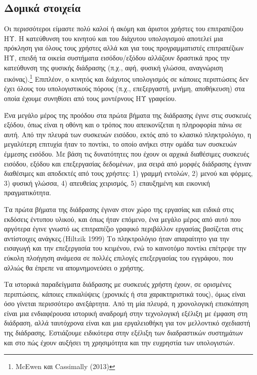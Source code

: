 \documentclass[
]{article}
\begin{document}
\hypertarget{ux3b4ux3bfux3bcux3b9ux3baux3ac-ux3c3ux3c4ux3bfux3b9ux3c7ux3b5ux3afux3b1}{%
\subsection{Δομικά
στοιχεία}\label{ux3b4ux3bfux3bcux3b9ux3baux3ac-ux3c3ux3c4ux3bfux3b9ux3c7ux3b5ux3afux3b1}}

Οι περισσότεροι είμαστε πολύ καλοί ή ακόμη και άριστοι χρήστες του
επιτραπέζιου ΗΥ. Η κατεύθυνση του κινητού και του διάχυτου υπολογισμού
αποτελεί μια πρόκληση για όλους τους χρήστες αλλά και για τους
προγραμματιστές επιτραπέζιων ΗΥ, επειδή τα οικεία συστήματα
εισόδου/εξόδου αλλάζουν δραστικά προς την κατεύθυνση της φυσικής
διάδρασης (π.χ., αφή, φυσική γλώσσα, αναγνώριση εικόνας).\footnote{McEwen
  και Cassimally (2013)} Επιπλέον, ο κινητός και διάχυτος υπολογισμός σε
κάποιες περιπτώσεις δεν έχει όλους του υπολογιστικούς πόρους (π.χ.,
επεξεργαστή, μνήμη, αποθήκευση) στα οποία έχουμε συνηθίσει από τους
μοντέρνους ΗΥ γραφείου.

Ένα μεγάλο μέρος της προόδου στα πρώτα βήματα της διάδρασης έγινε στις
συσκευές εξόδου, όπως είναι η οθόνη και ο τρόπος που απεικονίζεται η
πληροφορία πάνω σε αυτή. Από την πλευρά των συσκευών εισόδου, εκτός από
το κλασικό πληκτρολόγιο, η μεγαλύτερη επιτυχία ήταν το ποντίκι, το οποίο
ανήκει στην ομάδα των συσκευών έμμεσης εισόδου. Με βάση τις δυνατότητες
που έχουν οι αρχικά διαθέσιμες συσκευές εισόδου, εξόδου και επεξεργασίας
δεδομένων, μια σειρά από μορφές διάδρασης έγιναν διαθέσιμες και
αποδεκτές από τους χρήστες: 1) γραμμή εντολών, 2) μενού και φόρμες, 3)
φυσική γλώσσα, 4) απευθείας χειρισμός, 5) επαυξημένη και εικονική
πραγματικότητα.

Τα πρώτα βήματα της διάδρασης έγιναν στον χώρο της εργασίας και ειδικά
στις εκδόσεις έντυπου υλικού, και όπως ήταν επόμενο, ένα μεγάλο μέρος
από αυτό που αργότερα έγινε γνωστό ως επιτραπέζιο γραφικό περιβάλλον
εργασίας βασίζεται στις αντίστοιχες ανάγκες.(Hiltzik 1999) Το
πληκτρολόγιο ήταν απαραίτητο για την εισαγωγή και την επεξεργασία του
κειμένου, ενώ το καινοτόμο ποντίκι επέτρεψε την εύκολη πλοήγηση ανάμεσα
σε πολλές επιλογές επεξεργασίας του εγγράφου, που αλλιώς θα έπρεπε να
απομνημονεύσει ο χρήστης.

Τα ιστορικά παραδείγματα διάδρασης με συσκευές χρήστη έχουν, σε
ορισμένες περιπτώσεις, κάποιες επικαλύψεις (χρονικές ή στα
χαρακτηριστικά τους), όμως είναι όσο γίνεται περισσότερο ανεξάρτητα. Από
τη μία πλευρά, η χρονολογική επισκόπηση είναι μια ενδιαφέρουσα ιστορική
αναδρομή στην τεχνολογική εξέλιξη με έμφαση στη διάδραση, αλλά
ταυτόχρονα είναι και μια εργαλειοθήκη για τον μελλοντικό σχεδιαστή της
διάδρασης. Εστιάζουμε ειδικότερα στην εξέλιξη των διαδραστικών
συστημάτων και στο πώς έχουν αυξήσει τη χρησιμότητα και την ευχρηστία
των υπολογιστών.
\end{document}

